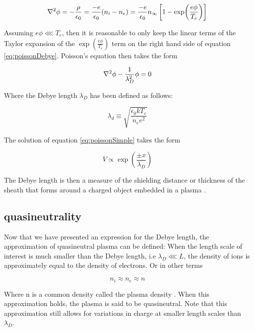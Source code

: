 \begin{equation}\label{eq:poissonDebye}
    \laplacian{\phi}  = - \frac{\rho}{\epsilon_0} = \frac{-e}{\epsilon_0} (n_i - n_e) = \frac{-e}{\epsilon_0} n_{\infty} \left[1 - \exp (\frac{e \phi}{T_e}) \right]
\end{equation}

Assuming $e \phi \lll T_e$, then it is reasonable to only keep the linear terms of the Taylor expansion of the $\exp (\frac{e \phi}{T_e})$ term on the right hand side of equation \ref{eq:poissonDebye}. Poisson's equation then takes the form

\begin{equation}\label{eq:poissonSimple}
    \laplacian{\phi} - \frac{1}{\lambda_D^2} \phi = 0
\end{equation}


Where the Debye length $\lambda_D$ has been defined as follows:

\begin{equation}\label{eq:Helmholtz}
    \lambda_d \equiv \sqrt{\frac{\epsilon_0 k T_e}{n_e e^2}}
\end{equation}

The solution of equation \ref{eq:poissonSimple} takes the form

\begin{equation*}
    V \propto \exp (\frac{\pm x}{\lambda_D})
\end{equation*}

The Debye length is then a measure of the shielding distance or thickness of the sheath that forms around a charged object embedded in a plasma .


\subsection{quasineutrality}
Now that we have presented an expression for the Debye length, the approximation of quasineutral plasma can be defined: When the length scale of interest is much smaller than the Debye length, i.e $\lambda_D \lll L$, the density of ions is approximately equal to the density of electrons. Or in other terms

\begin{equation}
    n_i \approx n_e \approx n
\end{equation}

Where n is a common density called the plasma density . When this approximation holds, the plasma is said to be quasineutral. Note that this approximation still allows for variations in charge at smaller length scales than $\lambda_D$. 

